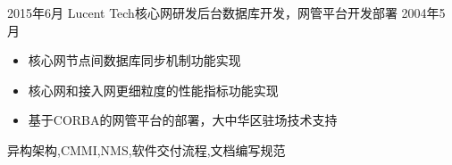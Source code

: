 \begin{experiences}
	\emptySeparator
	\experience
	{2015年6月} {Lucent Tech}{核心网研发}{后台数据库开发，网管平台开发部署}
	{2004年5月}    {
		\begin{itemize}
			\item 核心网节点间数据库同步机制功能实现
			\item 核心网和接入网更细粒度的性能指标功能实现
			\item 基于CORBA的网管平台的部署，大中华区驻场技术支持
		\end{itemize}
	}
	{异构架构,CMMI,NMS,软件交付流程,文档编写规范} 
	\emptySeparator
\end{experiences}
